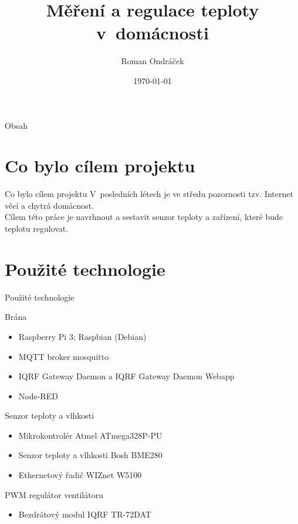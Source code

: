 \documentclass[11pt]{beamer}
\author[Roman Ondráček]{Roman Ondráček}
\title[Měření a regulace teploty]{Měření a regulace teploty v~domácnosti}
\institute[]{Gymnázium Boskovice}
\date{\today}
\begin{document}
\begin{frame}
\titlepage
\end{frame}

\begin{frame}{Obsah}
\tableofcontents
\end{frame}

\section{Co bylo cílem projektu}

\begin{frame}{Co bylo cílem projektu}
  V~posledních létech je ve středu pozornosti tzv. Internet věcí a chytrá domácnost. \\[4mm]
  Cílem této práce je navrhnout a sestavit senzor teploty a zařízení, které bude teplotu regulovat.
\end{frame}

\section{Použité technologie}

\begin{frame}{Použité technologie}
  \begin{exampleblock}{Brána}
    \begin{itemize}
      \item Raspberry Pi 3; Raspbian (Debian)
      \item MQTT broker mosquitto
      \item IQRF Gateway Daemon a IQRF Gateway Daemon Webapp
      \item Node-RED
    \end{itemize}
  \end{exampleblock}
  \begin{block}{Senzor teploty a vlhkosti}
    \begin{itemize}
      \item Mikrokontrolér Atmel ATmega328P-PU
      \item Senzor teploty a vlhkosti Bosh BME280
      \item Ethernetový řadič WIZnet W5100
    \end{itemize}
  \end{block}
  \begin{alertblock}{PWM regulátor ventilátoru}
    \begin{itemize}
      \item Bezdrátový modul IQRF TR-72DAT
    \end{itemize}
  \end{alertblock}
\end{frame}
\end{document}
